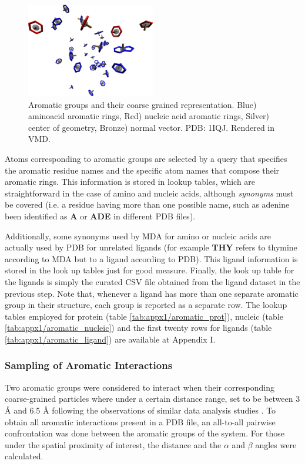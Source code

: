       \begin{figure}[H]
        \centering
        \includegraphics[width=0.5\textwidth]{figures/methods/aromatic.png}
        \caption{\label{fig:methods/aromatic} Aromatic groups and their coarse grained representation. Blue) aminoacid aromatic rings, Red) nucleic acid aromatic rings, Silver) center of geometry, Bronze) normal vector. PDB: 1IQJ. Rendered in VMD.}
      \end{figure}

      Atoms corresponding to aromatic groups are selected by a query that specifies the aromatic residue names and the specific atom names that compose their aromatic rings. This information is stored in lookup tables, which are straightforward in the case of amino and nucleic acids, although \textit{synonyms} must be covered (i.e. a residue having more than one possible name, such as adenine been identified as \textbf{A} or \textbf{ADE} in different PDB files).

      Additionally, some synonyms used by MDA for amino or nucleic acids are actually used by PDB for unrelated ligands (for example \textbf{THY} refers to thymine according to MDA but to a ligand according to PDB). This ligand information is stored in the look up tables just for good measure. Finally, the look up table for the ligands is simply the curated CSV file obtained from the ligand dataset in the previous step. Note that, whenever a ligand has more than one separate aromatic group in their structure, each group is reported as a separate row. The lookup tables employed for protein (table \ref{tab:appx1/aromatic_prot}), nucleic (table \ref{tab:appx1/aromatic_nucleic}) and the first twenty rows for ligands (table \ref{tab:appx1/aromatic_ligand}) are available at Appendix I.

    \subsubsection{Sampling of Aromatic Interactions}
      Two aromatic groups were considered to interact when their corresponding coarse-grained particles where under a certain distance range, set to be between {3 \AA} and {6.5 \AA} following the observations of similar data analysis studies \cite{aromatic_2018}. To obtain all aromatic interactions present in a PDB file, an all-to-all pairwise confrontation was done between the aromatic groups of the system. For those under the spatial proximity of interest, the distance and the $\alpha$ and $\beta$ angles were calculated.

